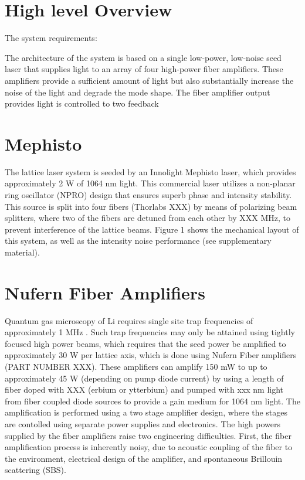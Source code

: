 \documentclass[twocolumn,aps,pra,showpacs,preprintnumbers,bibnotes]{revtex4-1}
\begin{document}
\section{High level Overview}
The system requirements:

The architecture of the system is based on a single low-power, low-noise seed laser that supplies light to an array of four high-power fiber amplifiers.
These amplifiers provide a sufficient amount of light but also substantially increase the noise of the light and degrade the mode shape. 
The fiber amplifier output provides light is controlled to two feedback 

\section{Mephisto}
The lattice laser system is seeded by an Innolight Mephisto laser, which provides approximately 2 W of 1064 nm light. 
This commercial laser utilizes a non-planar ring oscillator (NPRO) design that ensures superb phase and intensity stability. This source is split into four fibers (Thorlabs XXX) by means of polarizing beam splitters, where two of the fibers are detuned from each other by XXX MHz, to prevent interference of the lattice beams. Figure 1 shows the mechanical layout of this system, as well as the intensity noise performance (see supplementary material).


\section{Nufern Fiber Amplifiers}
Quantum gas microscopy of Li requires single site trap frequencies of approximately 1 MHz \cite{single site paper}.
Such trap frequencies may only be attained using tightly focused high power beams, which requires that the seed power be amplified to approximately 30 W per lattice axis, which is done using Nufern Fiber amplifiers (PART NUMBER XXX).
These amplifiers can amplify 150 mW to up to approximately 45 W (depending on pump diode current) by using a length of fiber doped with XXX (erbium or ytterbium) and pumped with xxx nm light from fiber coupled diode sources to provide a gain medium for 1064 nm light. 
The amplification is performed using a two stage amplifier design, where the stages are contolled using separate power supplies and electronics.
The high powers supplied by the fiber amplifiers raise two engineering difficulties. First, the fiber amplification process is inherently noisy, due to acoustic coupling of the fiber to the environment, electrical design of the amplifier, and spontaneous Brillouin scattering (SBS). 
\end{document}
